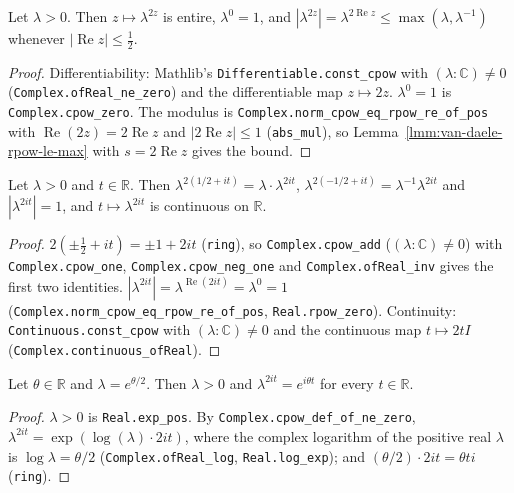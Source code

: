 \begin{lemma}
    \label{lmm:van-daele-phase-strip}
    \leanok
    Let $\lambda > 0$. Then $z \mapsto \lambda^{2z}$ is entire, $\lambda^{0} = 1$, and $|\lambda^{2z}| = \lambda^{2\operatorname{Re} z} \le \max(\lambda, \lambda^{-1})$ whenever $|\operatorname{Re} z| \le \tfrac{1}{2}$.
\end{lemma}
\begin{proof}
    \leanok
    Differentiability: Mathlib's \texttt{Differentiable.const\_cpow} with $(\lambda : \mathbb{C}) \ne 0$ (\texttt{Complex.ofReal\_ne\_zero}) and the differentiable map $z \mapsto 2z$. $\lambda^0 = 1$ is \texttt{Complex.cpow\_zero}. The modulus is \texttt{Complex.norm\_cpow\_eq\_rpow\_re\_of\_pos} with $\operatorname{Re}(2z) = 2\operatorname{Re} z$ and $|2\operatorname{Re} z| \le 1$ (\texttt{abs\_mul}), so Lemma~\ref{lmm:van-daele-rpow-le-max} with $s = 2\operatorname{Re} z$ gives the bound.
\end{proof}

\begin{lemma}
    \label{lmm:van-daele-phase-boundary}
    \leanok
    Let $\lambda > 0$ and $t \in \mathbb{R}$. Then $\lambda^{2(1/2 + it)} = \lambda \cdot \lambda^{2it}$, $\lambda^{2(-1/2 + it)} = \lambda^{-1}\lambda^{2it}$ and $|\lambda^{2it}| = 1$, and $t \mapsto \lambda^{2it}$ is continuous on $\mathbb{R}$.
\end{lemma}
\begin{proof}
    \leanok
    $2(\pm\tfrac{1}{2} + it) = \pm 1 + 2it$ (\texttt{ring}), so \texttt{Complex.cpow\_add} ($(\lambda : \mathbb{C}) \ne 0$) with \texttt{Complex.cpow\_one}, \texttt{Complex.cpow\_neg\_one} and \texttt{Complex.ofReal\_inv} gives the first two identities. $|\lambda^{2it}| = \lambda^{\operatorname{Re}(2it)} = \lambda^0 = 1$ (\texttt{Complex.norm\_cpow\_eq\_rpow\_re\_of\_pos}, \texttt{Real.rpow\_zero}). Continuity: \texttt{Continuous.const\_cpow} with $(\lambda : \mathbb{C}) \ne 0$ and the continuous map $t \mapsto 2tI$ (\texttt{Complex.continuous\_ofReal}).
\end{proof}

\begin{lemma}[$\lambda^{2it}$ for $\lambda = e^{\theta/2}$]
    \label{lmm:van-daele-phase-fourier}
    \leanok
    Let $\theta \in \mathbb{R}$ and $\lambda = e^{\theta/2}$. Then $\lambda > 0$ and $\lambda^{2it} = e^{i\theta t}$ for every $t \in \mathbb{R}$.
\end{lemma}
\begin{proof}
    \leanok
    $\lambda > 0$ is \texttt{Real.exp\_pos}. By \texttt{Complex.cpow\_def\_of\_ne\_zero}, $\lambda^{2it} = \exp(\log(\lambda)\cdot 2it)$, where the complex logarithm of the positive real $\lambda$ is $\log\lambda = \theta/2$ (\texttt{Complex.ofReal\_log}, \texttt{Real.log\_exp}); and $(\theta/2)\cdot 2it = \theta t i$ (\texttt{ring}).
\end{proof}

